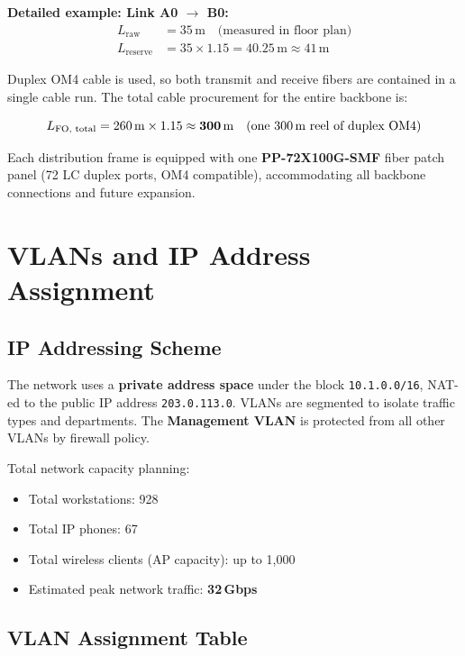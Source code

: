 \documentclass[12pt,a4paper]{report}
\begin{document}
\textbf{Detailed example: Link A0 $\to$ B0:}
\begin{align*}
  L_{\text{raw}}    &= 35\,\mathrm{m} \quad\text{(measured in floor plan)} \\
  L_{\text{reserve}}&= 35 \times 1.15 = 40.25\,\mathrm{m} \approx 41\,\mathrm{m}
\end{align*}

Duplex OM4 cable is used, so both transmit and receive fibers are contained in a
single cable run. The total cable procurement for the entire backbone is:

\[
  L_{\text{FO, total}} = 260\,\mathrm{m} \times 1.15 \approx \mathbf{300\,\mathrm{m}}
  \quad \text{(one 300\,m reel of duplex OM4)}
\]

Each distribution frame is equipped with one \textbf{PP-72X100G-SMF} fiber patch panel
(72 LC duplex ports, OM4 compatible), accommodating all backbone connections and future expansion.

\chapter{VLANs and IP Address Assignment}


\section{IP Addressing Scheme}

\label{chap:vlans}
The network uses a \textbf{private address space} under the block \texttt{10.1.0.0/16},
NAT-ed to the public IP address \texttt{203.0.113.0}.
VLANs are segmented to isolate traffic types and departments.
The \textbf{Management VLAN} is protected from all other VLANs by firewall policy.

Total network capacity planning:
\begin{itemize}[noitemsep]
  \item Total workstations: 928
  \item Total IP phones: 67
  \item Total wireless clients (AP capacity): up to 1{,}000
  \item Estimated peak network traffic: \textbf{32\,Gbps}
\end{itemize}

\section{VLAN Assignment Table}
\end{document}
